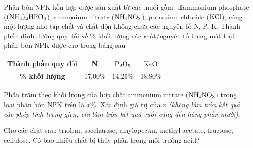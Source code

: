\documentclass[11pt,a4paper]{article}
\begin{document}
\begin{ex}
Phân bón NPK hỗn hợp được sản xuất từ các muối gồm: diammonium phosphate ($(\ce{NH4})_2\ce{HPO4}$), ammonium nitrate ($\ce{NH4NO3}$), potassium chloride ($\ce{KCl}$), cùng một lượng nhỏ tạp chất và chất độn không chứa các nguyên tố N, P, K. Thành phần dinh dưỡng quy đổi về \% khối lượng các chất/nguyên tố trong một loại phân bón NPK được cho trong bảng sau:
\begin{center}
\begin{tabular}{|c|c|c|c|}
\hline
\textbf{Thành phần quy đổi} & \textbf{N} & \textbf{$\ce{P2O5}$} & \textbf{$\ce{K2O}$} \\
\hline
\textbf{\% khối lượng} & 17,00\% & 14,20\% & 18,80\% \\
\hline
\end{tabular}
\end{center}
Phần trăm theo khối lượng của hợp chất ammonium nitrate ($\ce{NH4NO3}$) trong loại phân bón NPK trên là $x$\%. Xác định giá trị của $x$ \textit{(không làm tròn kết quả các phép tính trung gian, chỉ làm tròn kết quả cuối cùng đến hàng phần mười)}.
\end{ex}

\begin{ex}
Cho các chất sau: triolein, saccharose, amylopectin, methyl acetate, fructose, cellulose. Có bao nhiêu chất bị thủy phân trong môi trường acid?
\end{ex}
\end{document}
